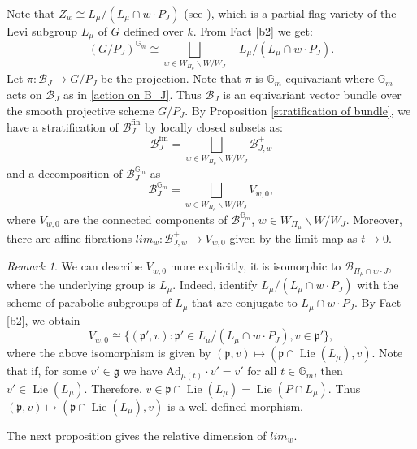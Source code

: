 \documentclass{amsart}
\newcommand{\gm}{\mathbb{G}_{m}}
\theoremstyle{plain}
\theoremstyle{definition}
\theoremstyle{remark}
\newtheorem{remark}{Remark}[section]
\DeclareMathOperator{\lie}{Lie}
\DeclareMathOperator{\fin}{fin}
\begin{document}
Note that $Z_{w}\cong L_{\mu}/(L_{\mu}\cap w\cdot P_{J})$ (see \cite[Proposition 7.12]{Mil1}), which is a partial flag variety of the Levi subgroup $L_{\mu}$ of $G$ defined over $k$. From Fact \ref{b2} we get:
\[
(G/P_{J})^{\mathbb{G}_{m}}\cong\displaystyle\bigsqcup_{w\in W_{\Pi_{\mu}}\backslash W/W_{J}}\quad L_{\mu}/(L_{\mu}\cap w\cdot P_{J}).
\]
Let $\pi: \mathcal{B}_{J}\rightarrow G/P_{J}$ be the projection.
Note that $\pi$ is $\gm$-equivariant where $\gm$ acts on $\mathcal{B}_{J}$ as in \eqref{action on B_J}. Thus $\mathcal{B}_{J}$ is an equivariant vector bundle over the smooth projective scheme $G/P_{J}$. By 
Proposition \ref{stratification of bundle}, we have a stratification of $\mathcal{B}_{J}^{\fin}$ by locally closed subsets as:
\begin{equation}\label{prpn2}
\mathcal{B}_{J}^{\fin}=\displaystyle\bigsqcup_{w\in W_{\Pi_{\mu}}\backslash W/W_{J}}\mathcal{B}_{J,w}^{+}
\end{equation}
and a decomposition of $\mathcal{B}_{J}^{\gm}$ as
\begin{equation}\label{relative dimension}
\mathcal{B}_{J}^{\gm}=\bigsqcup_{w\in W_{\Pi_{\mu}}\backslash W/W_{J}}V_{w,0},
\end{equation}
where $V_{w,0}$ are the connected components of $\mathcal{B}_{J}^{\gm}$, $w\in W_{\Pi_{\mu}}\backslash W/W_{J}$. 
Moreover, there are affine fibrations $lim_{w}:\mathcal{B}_{J,w}^{+}\rightarrow V_{w,0}$ given by the limit map as $t\to 0$.
\begin{remark}
We can describe $V_{w,0}$ more explicitly, it is isomorphic to $\mathcal{B}_{\Pi_{\mu}\cap w\cdot J}$, where the underlying group is $L_{\mu}$.
Indeed, identify $L_\mu/(L_{\mu}\cap w\cdot P_{J})$ with the scheme of parabolic subgroups of $L_{\mu}$ that are conjugate to $L_{\mu}\cap w\cdot P_{J}$. By Fact \ref{b2}, we obtain
\begin{equation}\label{pre-steinberg}
V_{w,0}\cong\{(\mathfrak{p}',v):\mathfrak{p}'\in L_\mu/(L_{\mu}\cap w\cdot P_{J}),v\in\mathfrak{p}'\},
\end{equation}
where the above isomorphism is given by $(\mathfrak{p},v)\mapsto(\mathfrak{p}\cap \lie(L_{\mu}),v)$. Note that if, for some $v'\in\mathfrak{g}$ we have $\text{Ad}_{\mu(t)}\cdot v'=v'$ for all $t\in\gm$, then $v'\in\lie(L_\mu)$. Therefore, $v\in\mathfrak{p}\cap\lie(L_{\mu})=\lie(P\cap L_{\mu})$. Thus $(\mathfrak{p},v)\mapsto(\mathfrak{p}\cap \lie(L_{\mu}),v)$ is a well-defined morphism.
\end{remark}
The next proposition gives the relative dimension of $lim_{w}$.
\end{document}
